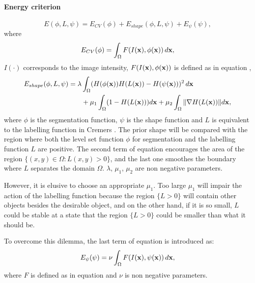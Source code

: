 \paragraph{Energy criterion}
\begin{equation}
  \label{eq:NRJ_chan2005}
  E(\phi,L,\psi) = E_{CV}(\phi) + E_{shape}(\phi,L,\psi) + E_{\psi}(\psi),
\end{equation}
where
\begin{equation}
  \label{eq:Ecv_chan2005}
  E_{CV}(\phi) = \int_\Omega F(I(\mathbf{x}), \phi(\mathbf{x})) \, d\mathbf{x},
\end{equation}
$I(\cdot)$ corresponds to the image intensity, $F(I(\mathbf{x}), \phi(\mathbf{x}))$ is defined as in equation ,
\begin{align}
  \label{eq:Eshape_chan2005}
  \nonumber E_{shape}(\phi,L,\psi) = \lambda & \int_\Omega (H(\phi(\mathbf{x}))H(L(\mathbf{x})) - H(\psi(\mathbf{x})))^2 \, d\mathbf{x} \\
	& + \mu_1 \int_\Omega (1- H(L(\mathbf{x}))) d\mathbf{x} + \mu_2 \int_\Omega \| \nabla H(L(\mathbf{x})) \| d\mathbf{x},
\end{align}
where $\phi$ is the segmentation function, $\psi$ is the shape function and $L$ is equivalent to the labelling function in Cremers \etal \cite{Cremers2003b}. The prior shape will be compared with the region where both the level set function $\phi$ for segmentation and the labelling function $L$ are positive. The second term of equation  encourages the area of the region $ \{ (x, y) \in \Omega : L(x, y) > 0 \}$, and the last one smoothes the boundary where $L$ separates the domain $\Omega$. $\lambda$, $\mu_1$, $\mu_2$ are non negative parameters.

However, it is elusive to choose an appropriate $\mu_1$. Too large $\mu_1$ will impair the action of the labelling function because the region $\{L > 0\}$ will contain other objects besides the desirable object, and on the other hand, if it is so small, $L$ could be stable at a state that the region $\{L > 0\}$ could be smaller than what it should be.

To overcome this dilemma, the last term of equation  is introduced as:
\begin{equation}
  \label{eq:Epsi_chan2005}
  E_{\psi}(\psi) = \nu \int_\Omega F(I(\mathbf{x}), \psi(\mathbf{x})) \, d\mathbf{x},
\end{equation}
where $F$ is defined as in equation  and $\nu$ is non negative parameters.

